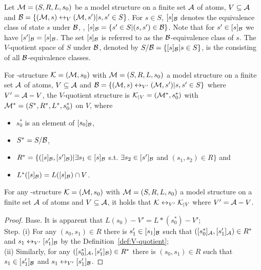 \documentclass{article}
\begin{document}
Let ${\cal M}=(S, R, L,s_0)$ be a model structure on a finite set ${\cal A}$ of atoms, $V\subseteq {\cal A}$ and ${\cal B} = \{({\cal M}, s) \leftrightarrow_V ({\cal M}, s') | s, s' \in S\}$.
For $s\in S$, $[s]_{{\cal B}}$ denotes the equivalence class of state $s$ under ${\cal B}$, \ie, $[s]_{{\cal B}}=\{s' \in S| (s, s') \in {\cal B}\}$.
Note that for $s'\in [s]_{{\cal B}}$ we have $[s']_{{\cal B}} = [s]_{{\cal B}}$.
The set $[s]_{{\cal B}}$ is referred to as the ${\cal B}$-equivalence class of $s$.
The $V$-quotient space of $S$ under ${\cal B}$, denoted by $S/{\cal B}=\{[s]_{{\cal B}}| s\in S\}$, is the consisting of all ${\cal B}$-equivalence classes.
\begin{definition}
\label{def:V-quotient}
For \MPK-structure ${\cal K} = ({\cal M}, s_0)$ with ${\cal M} = (S, R, L,s_0)$ a model structure on a finite set ${\cal A}$ of atoms, $V \subseteq {\cal A}$ and ${\cal B} = \{({\cal M}, s) \leftrightarrow_{V'} ({\cal M}, s') | s, s' \in S\}$ where $V' ={\cal A}-V$, the $V$-quotient structure is ${\cal K}_{|V}=({\cal M}^*, s_0^*)$ with ${\cal M}^*=(S^*, R^*, L^*,s_0^*)$ on $V$, where
\begin{itemize}
  \item $s_0^*$ is an element of $[s_0]_{{\cal B}}$,
  \item $S^* = S/{\cal B}$, %
  \item $R^* = \{([s]_{{\cal B}},[s']_{{\cal B}})| \exists s_1\in [s]_{{\cal B}}$ s.t. $\exists s_2\in [s']_{{\cal B}}$ and $(s_1, s_2) \in R\}$ and
  \item $L^*([s]_{{\cal B}}) = L([s]_{{\cal B}}) \cap V$.
\end{itemize}
\end{definition}


\begin{proposition}
\label{pro:VQ}
For any \MPK-structure ${\cal K} = ({\cal M}, s_0)$ with ${\cal M} = (S, R, L,s_0)$ a model structure on a finite set ${\cal A}$ of atoms and $V \subseteq {\cal A}$, it holds that ${\cal K}\leftrightarrow_{V'} {\cal K}_{|V}$ where $V'={\cal A}-V$.
\end{proposition}
\begin{proof}
Base. It is apparent that $L(s_0)- V' = L*(s_0^*)- V'$;\\
Step. (i) For any $(s_0, s_1) \in R$ there is $s_1' \in [s_1]_{{\cal B}}$ such that $([s_0^*]_{{\cal A}}, [s_1']_{{\cal A}}) \in R^*$ and $s_1 \leftrightarrow_{V'} [s_1']_{{\cal B}}$ by the Definition~\ref{def:V-quotient};\\
(ii) Similarly, for any $([s_0^*]_{{\cal A}}, [s_1']_{{\cal B}})\in R^*$ there is $(s_0, s_1) \in R$ such that $s_1 \in [s_1']_{{\cal B}}$ and $s_1 \leftrightarrow_{V'} [s_1']_{{\cal B}}$.
\end{proof}
\end{document}
